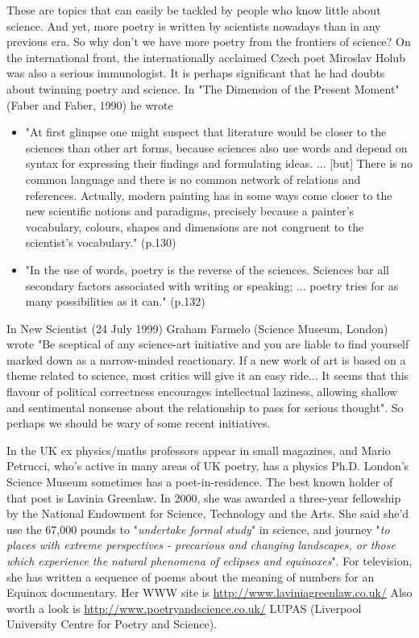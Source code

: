 \documentclass[11pt]{article}
\begin{document}
These are topics that can easily be tackled by people who know little
about science. And yet, more poetry is written by scientists nowadays than in 
any previous era. So why don't we have more poetry from the frontiers of science? On the international front, the internationally acclaimed
Czech poet Miroslav Holub was also a serious immunologist. It is perhaps
significant that he had doubts about twinning poetry and science. In  "The Dimension of the Present Moment" (Faber and Faber, 1990) he wrote
\begin{itemize}
\item "At first glimpse one might suspect that literature would be closer to the sciences than other art forms, because sciences also use words and depend on syntax for expressing their findings and formulating ideas. ... [but] There is no common language and there is no common network of relations and references. Actually, modern painting has in some ways come closer to the new scientific notions and paradigms, precisely because a painter's vocabulary, colours, shapes and dimensions are not congruent to the scientist's vocabulary." (p.130) 
\item "In the use of words, poetry is the reverse of the sciences. Sciences bar all secondary factors associated with writing or speaking; ... poetry tries for as many possibilities as it can." (p.132)
\end{itemize}

In New Scientist (24 July 1999) Graham Farmelo (Science Museum, London)
wrote "Be sceptical of any science-art initiative and you are liable to find 
yourself marked down as a narrow-minded reactionary. If a new work of art is 
based on a theme related to science, most critics will give it an easy ride...
It seems that this flavour of political correctness encourages intellectual 
laziness, allowing shallow and sentimental nonsense about the relationship
to pass for serious thought". So perhaps we should be wary of some recent
initiatives.

In the UK ex physics/maths professors appear in small magazines, and
Mario Petrucci, who's active in many areas of UK poetry, has a physics
Ph.D. London's Science Museum sometimes has a poet-in-residence. The
best known holder of that post is Lavinia Greenlaw. In 2000, she was awarded 
a three-year fellowship by the National Endowment for Science, Technology 
and the Arts. She said she'd use the 67,000 pounds to "\textit{undertake formal study}" in science, and journey "\textit{to places with extreme
   perspectives - precarious and changing landscapes, or those which
   experience the natural phenomena of eclipses and equinoxes}". 
For television, she has written a sequence of poems about the 
meaning of numbers for an Equinox documentary. Her WWW site is
\url{http://www.laviniagreenlaw.co.uk/}
Also worth a look is \url{http://www.poetryandscience.co.uk/} LUPAS (Liverpool University Centre for Poetry and Science).
\end{document}
